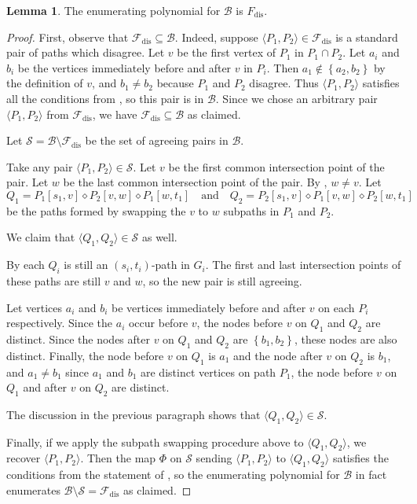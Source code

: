 \documentclass[11pt]{article}
\newcommand{\set}[1]{\left\{#1\right\}}
\newcommand{\dia}{\diamond}
\DeclareMathOperator{\dist}{dist}
\newcommand{\ca}{\mathcal}
\newcommand{\sub}{\subseteq}
\newcommand{\Frev}{F_{\text{dis}}}
\newcommand{\Fdis}{\mathcal{F}_{\text{dis}}}
\theoremstyle{definition}
\newtheorem{lemma}[theorem]{Lemma}
\begin{document}
\begin{lemma}
\label{lem:relax-disagreeing-paths}
    The enumerating polynomial for $\ca{B}$ is $\Frev$.
\end{lemma}
\begin{proof}
    First, observe that $\Fdis\sub\ca{B}$.
    Indeed, suppose $\langle P_1,P_2\rangle\in\Fdis$ is a standard pair of paths which disagree.
    Let $v$ be the first vertex of $P_1$ in $P_1\cap P_2$.
    Let $a_i$ and $b_i$ be the vertices immediately before and after $v$ in $P_i$.
    Then $a_1\not\in\set{a_2,b_2}$ by the definition of $v$, and $b_1\neq b_2$ because $P_1$ and $P_2$ disagree.
    Thus $\langle P_1,P_2\rangle$ satisfies all the conditions from , so this pair is in $\ca{B}$.
    Since we chose an arbitrary pair $\langle P_1,P_2\rangle$ from $\Fdis$, we have $\Fdis\sub\ca{B}$ as claimed.

    Let $\ca{S} = \ca{B}\setminus \Fdis$ be the set of agreeing pairs in $\ca{B}$.

    Take any pair $\langle P_1,P_2\rangle\in\ca{S}$.
    Let $v$ be the first common intersection point of the pair.
    Let $w$ be the last common intersection point of the pair.
    By , $w\neq v$.
    Let
        \[Q_1 = P_1[s_1,v]\dia P_2[v,w]\dia P_1[w,t_1]
        \quad\text{and}
        \quad
        Q_2 = P_2[s_1,v]\dia P_1[v,w]\dia P_2[w,t_1]
        \]
    be the paths formed by swapping the $v$ to $w$ subpaths in $P_1$ and $P_2$.

    We claim that $\langle Q_1,Q_2\rangle\in\ca{S}$ as well.

    By  each $Q_i$ is still an $(s_i,t_i)$-path in $G_i$.
    The first and last intersection points of these paths are still $v$ and $w$, so the new pair is still agreeing.
    
    Let vertices $a_i$ and $b_i$ be vertices immediately before and after $v$ on each $P_i$ respectively.
    Since the $a_i$ occur before $v$, the nodes before $v$ on $Q_1$ and $Q_2$ are distinct.
    Since the nodes after $v$ on $Q_1$ and $Q_2$ are $\set{b_1, b_2}$, these nodes are also distinct.
    Finally, the node before $v$ on $Q_1$ is $a_1$  and the node after $v$ on $Q_2$ is $b_1$, and $a_1\neq b_1$ since $a_1$ and $b_1$ are distinct vertices on path $P_1$, the node before $v$ on $Q_1$ and after $v$ on $Q_2$ are distinct.
    
    The discussion in the previous paragraph shows that $\langle Q_1,Q_2\rangle\in\ca{S}$.

    Finally, if we apply the subpath swapping procedure above to $\langle Q_1,Q_2\rangle$, we recover $\langle P_1,P_2\rangle$.
    Then the map $\Phi$ on $\ca{S}$ sending $\langle P_1,P_2\rangle$ to $\langle Q_1,Q_2\rangle$ satisfies the conditions from the statement of , so the enumerating polynomial for $\ca{B}$ in fact enumerates $\ca{B}\setminus\ca{S} = \Fdis$ as claimed.
\end{proof}
\end{document}
